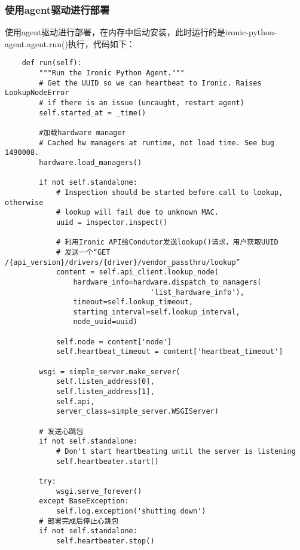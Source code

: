 \documentclass[a4paper,left=1.5cm,right=1.5cm,11pt]{article}
\begin{document}
\subsubsection{使用agent驱动进行部署}
	使用agent驱动进行部署，在内存中启动安装，此时运行的是ironic-python-agent.agent.run()执行，代码如下：
	\begin{lstlisting}
	def run(self):
        """Run the Ironic Python Agent."""
        # Get the UUID so we can heartbeat to Ironic. Raises LookupNodeError
        # if there is an issue (uncaught, restart agent)
        self.started_at = _time()

        #加载hardware manager
        # Cached hw managers at runtime, not load time. See bug 1490008.
        hardware.load_managers()

        if not self.standalone:
            # Inspection should be started before call to lookup, otherwise
            # lookup will fail due to unknown MAC.
            uuid = inspector.inspect()

            # 利用Ironic API给Condutor发送lookup()请求，用户获取UUID
			# 发送一个“GET /{api_version}/drivers/{driver}/vendor_passthru/lookup”
            content = self.api_client.lookup_node(
                hardware_info=hardware.dispatch_to_managers(
                                  'list_hardware_info'),
                timeout=self.lookup_timeout,
                starting_interval=self.lookup_interval,
                node_uuid=uuid)

            self.node = content['node']
            self.heartbeat_timeout = content['heartbeat_timeout']

        wsgi = simple_server.make_server(
            self.listen_address[0],
            self.listen_address[1],
            self.api,
            server_class=simple_server.WSGIServer)

        # 发送心跳包
        if not self.standalone:
            # Don't start heartbeating until the server is listening          
            self.heartbeater.start()

        try:
            wsgi.serve_forever()
        except BaseException:
            self.log.exception('shutting down')
        # 部署完成后停止心跳包
        if not self.standalone:
            self.heartbeater.stop()
	\end{lstlisting}
\end{document}
